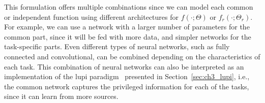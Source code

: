 This formulation offers multiple combinations since we can model each common or independent function using different architectures for $f(\cdot; \Theta)$ or $f_r(\cdot; \Theta_r)$.
%
For example, we can use a network with a larger number of parameters for the common part, since it will be fed with more data, and simpler networks for the task-specific parts.
%
Even different types of neural networks, such as fully connected and convolutional, can be combined depending on the characteristics of each task.
This combination of neural networks can also be interpreted as an implementation of the \acrfull{lupi} paradigm~\citep{VapnikI15a} presented in Section~\ref{sec:ch3_lupi}, i.e., the common network captures the privileged information for each of the tasks, since it can learn from more sources.
%

%
